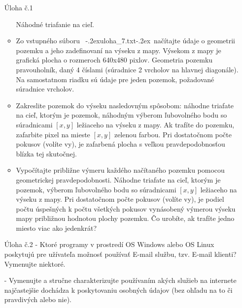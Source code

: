 \documentclass[a4paper,twoside,12pt]{report}
\newcommand{\du}{\unskip\smash{\lower 1.4ex\hbox{\char34}}\kern-.2ex}
\newcommand{\hu}{\kern-.2ex\hbox{\char92}}
\begin{document}
{\begin{itemize}
\item[Úloha č.1]
\begin{itemize}
\item[]
Náhodné triafanie na cieľ.
\item
Zo vstupného súboru  \ \du uloha\_7.txt\hu \ načítajte údaje o geometrii pozemku a jeho zadefinovaní na výseku z mapy. Výsekom z mapy je grafická plocha o rozmeroch 640x480 pixlov. 
Geometria pozemku pravouholník, daný 4 číslami (súradnice 2 vrcholov na hlavnej diagonále). Na samostatnom riadku sú údaje pre jeden pozemok, požadované súradnice vrcholov.
\item
Zakreslite pozemok do výseku nasledovným spôsobom: náhodne triafate na cieľ, ktorým je pozemok, náhodným výberom ľubovolného bodu so súradnicami $[x, y]$ ležiaceho na výseku z mapy. Ak trafíte do pozemku, zafarbite pixel na mieste $[x, y]$ zelenou farbou. Pri dostatočnom počte pokusov (volíte vy), je zafarbená plocha s veľkou pravdepodobnosťou blízka tej skutočnej.
\item
Vypočítajte približne výmeru každého načítaného pozemku pomocou geome\-trickej pravdepodobnosti. Náhodne triafate na cieľ, ktorým je pozemok, výbe\-rom ľubovolného bodu so súradnicami $[x, y]$ ležiaceho na výseku z mapy. Pri dostatočnom počte pokusov (volíte vy), je podiel počtu úspešných k počtu všetkých pokusov vynásobený výmerou výseku mapy približnou hodnotou plochy pozemku. Čo urobíte, ak trafíte jedno miesto viac ako jedenkrát?
\end{itemize}

\item[Úloha č.2]
- Ktoré programy v prostredí OS Windows alebo OS Linux poskytujú pre užívateľa možnosť používať E-mail službu, tzv.  E-mail klienti? Vymenujte niektoré.

- Vymenujte a stručne charakterizujte používaním akých služieb na internete najčastejšie dochádza k poskytovaniu osobných údajov (bez ohľadu na to či pravdivých alebo nie).
\end{itemize}

}%

\end{document}
